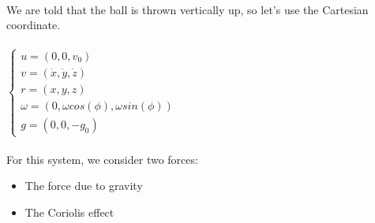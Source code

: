 \documentclass[fleqn]{article}
\begin{document}
\begin{enumerate}
      \textcolor{hwColor}{
        \\
        We are told that the ball is thrown vertically up, so let's use the Cartesian coordinate. \\
        \\
        $
          \begin{cases}
            u=(0,0,v_0)
            \\
            v=(\dot{x}, \dot{y}, \dot{z})
            \\
            r=(x,y,z)
            \\
            \omega=(0, \omega cos(\phi), \omega sin(\phi))
            \\
            g=(0, 0, -g_0)
          \end{cases}
        $
        \\
        \\
        For this system, we consider two forces:
        \begin{itemize}
          \item The force due to gravity
          \item The Coriolis effect
        \end{itemize}
      }


\end{enumerate}
\end{document}

